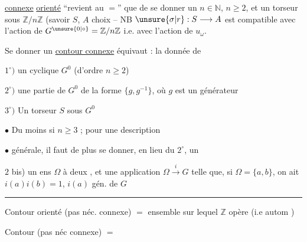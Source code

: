 \uline{connexe} \uline{orienté} ``revient au $=$'' que de se donner un $n\in\mathbb{N}$, $n\geq2$, et un  torseur sous $\mathbb{Z}/n\mathbb{Z}$ (savoir $S$,  $A$  choix -- NB $\unsure{\sigma|r}:S\longrightarrow A$ est compatible avec l'action de $G^{\unsure{0|\circ}}=\mathbb{Z}/n\mathbb{Z}$ i.e. avec l'action de $u_{\omega}$.

Se donner un \uline{contour connexe} équivaut : la donnée de

$1^{\circ})$ un  cyclique $G^{0}$ (d'ordre $n\geq2$)

$2^{\circ})$ une  partie de $G^{0}$  de la forme $\{g,g^{-1}\}$, où $g$ est un générateur 

$3^{\circ})$ Un torseur $S$ sous $G^{0}$

$\bullet$ Du moins si $n\geq3$  ; pour une description

$\bullet$ générale, il faut de plus se donner, en lieu du $2^{\circ}$, un

$2$ bis) un ens $\Omega$ à deux , et une application $\Omega\xrightarrow{i}G$ telle que, si $\Omega=\{a,b\}$, on ait $i(a)i(b)=1$, $i(a)$ gén. de $G$

\begin{center}\rule{1cm}{.35pt}\end{center}

Contour orienté (pas néc. connexe) $=$ ensemble sur lequel $\mathbb{Z}$ opère (i.e  autom )

Contour (pas néc connexe) $=$ 
